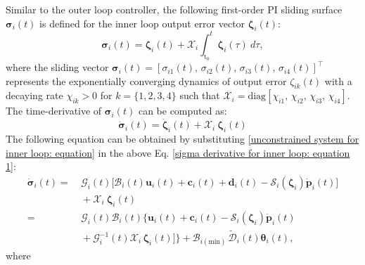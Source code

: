 \documentclass[lettersize,journal]{IEEEtran}
\begin{document}
Similar to the outer loop controller, the following first-order PI sliding surface $\boldsymbol{\sigma}_i(t)$ is defined for the inner loop output error vector $\boldsymbol{\zeta}_i(t)$:
\begin{equation} \label{sigma for inner loop: equation}
    \boldsymbol{\sigma}_i(t) = \boldsymbol{\zeta}_i(t) + \mathcal{X}_i \int_{\text{t}_0}^t \boldsymbol{\zeta}_i(\tau)~d\tau,
\end{equation}
where the sliding vector $\boldsymbol{\sigma}_i(t)  = [\sigma_{i 1}(t),\, \sigma_{i 2}(t),\, \sigma_{i 3}(t),\, \sigma_{i 4}(t)]^{\top}$ represents the exponentially converging dynamics of output error $\zeta_{i k}(t)$ with a decaying rate $\chi_{i k} > 0$ for $k = \{1, 2, 3, 4\}$ such that $\mathcal{X}_i = \text{diag}[\chi_{i 1},\, \chi_{i 2},\, \chi_{i 3},\, \chi_{i 4}]$.
The time-derivative of $\boldsymbol{\sigma}_i(t)$ can be computed as:
\begin{equation} \label{sigma derivative for inner loop: equation 1}
    \dot{\boldsymbol{\sigma}}_i(t) = \dot{\boldsymbol{\zeta}}_i(t) + \mathcal{X}_i~\boldsymbol{\zeta}_i(t)
\end{equation}
The following equation can be obtained by substituting  \eqref{unconstrained system for inner loop: equation} in the above Eq. \eqref{sigma derivative for inner loop: equation 1}:
\begin{align}
    \label{sigma derivative for inner loop: equation 2}
    \dot{\boldsymbol{\sigma}}_i(t) =& ~\mathcal{G}_i(t) \big[\mathcal{B}_i(t) \boldsymbol{u}_i(t) + \boldsymbol{c}_i(t) + \boldsymbol{d}_i(t) - \mathcal{S}_i(\boldsymbol{\zeta}_i) \dot{\boldsymbol{p}}_i(t) \big] \nonumber \\
    &~ + \mathcal{X}_i~\boldsymbol{\zeta}_i(t) \nonumber \\
    = &~ \mathcal{G}_i(t) \mathcal{B}_i(t) \big\{\boldsymbol{u}_i(t) +  \boldsymbol{c}_i(t) - \mathcal{S}_i(\boldsymbol{\zeta}_i) \dot{\boldsymbol{p}}_i(t) \nonumber \\ 
    & ~ + \mathcal{G}_i^{-1}(t) \mathcal{X}_i\,\boldsymbol{\zeta}_i(t) \big] \big\} + \mathcal{B}_{i (\text{min})} \, \tilde{\mathcal{D}}_i(t) \boldsymbol{\theta}_i(t), 
\end{align}
where 
\end{document}
